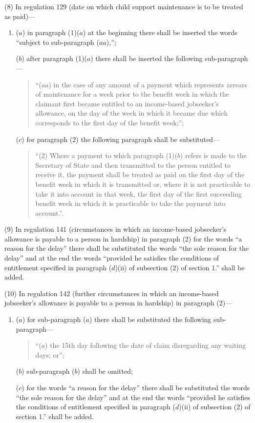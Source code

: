\documentclass[12pt,a4paper]{article}
\begin{document}
(8) In regulation 129 (date on which child support maintenance is to be treated as paid)—
\begin{enumerate}\item[]
($a$) in paragraph (1)($a$) at the beginning there shall be inserted the words “subject to sub-paragraph ($aa$),”;

($b$) after paragraph (1)($a$) there shall be inserted the following sub-paragraph—
\begin{quotation}
“($aa$) in the case of any amount of a payment which represents arrears of maintenance for a week prior to the benefit week in which the claimant first became entitled to an income-based jobseeker’s allowance, on the day of the week in which it became due which corresponds to the first day of the benefit week;”;
\end{quotation}

($c$) for paragraph (2) the following paragraph shall be substituted—
\begin{quotation}
“(2) Where a payment to which paragraph (1)($b$) refers is made to the Secretary of State and then transmitted to the person entitled to receive it, the payment shall be treated as paid on the first day of the benefit week in which it is transmitted or, where it is not practicable to take it into account in that week, the first day of the first succeeding benefit week in which it is practicable to take the payment into account.”.
\end{quotation}
\end{enumerate}

(9) In regulation 141 (circumstances in which an income-based jobseeker’s allowance is payable to a person in hardship) in paragraph (2) for the words “a reason for the delay” there shall be substituted the words “the sole reason for the delay” and at the end the words “provided he satisfies the conditions of entitlement specified in paragraph ($d$)(ii) of subsection (2) of section 1.” shall be added.

(10) In regulation 142 (further circumstances in which an income-based jobseeker’s allowance is payable to a person in hardship) in paragraph (2)—
\begin{enumerate}\item[]
($a$) for sub-paragraph ($a$) there shall be substituted the following sub-paragraph—
\begin{quotation}
“($a$) the 15th day following the date of claim disregarding any waiting days; or”;
\end{quotation}

($b$) sub-paragraph ($b$) shall be omitted;

($c$) for the words “a reason for the delay” there shall be substituted the words “the sole reason for the delay” and at the end the words “provided he satisfies the conditions of entitlement specified in paragraph ($d$)(ii) of subsection (2) of section 1.” shall be added.
\end{enumerate}
\end{document}
